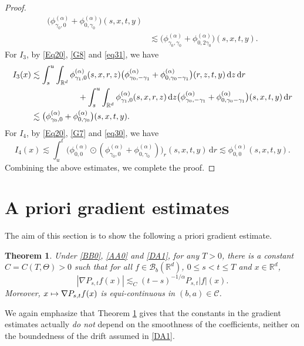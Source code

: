 \documentclass[JEP,XML,SOM,Unicode,published]{cedram}
\def\mto{\mathchoice{\longmapsto}{\mapsto}{\mapsto}{\mapsto}}
\theoremstyle{plain}
\newtheorem{theorem}{Theorem}[section]
\theoremstyle{definition}
\newcommand\cB{{\mathcal B}}
\newcommand\mR{\mathbb{R}}
\newcommand\1{{\mathbf{1}}}
\newcommand\sC{{\mathscr C}}
\newcommand{\dif}{\,\mathrm{d}}
\begin{document}
\begin{proof}
\begin{align*}
\bigl(\phi^{(\alpha)}_{\gamma_0,0}+\phi^{(\alpha)}_{0,\gamma_0}\bigr)(s,x,t,y)
\\&\lesssim\bigl(\phi^{(\alpha)}_{\gamma_0,\gamma_0}+\phi^{(\alpha)}_{0,2\gamma_0}\bigr)(s,x,t,y).
\end{align*}
For $I_3$, by {\eqref{Eq20}}, \eqref{G8} and \eqref{eq31}, we have
\begin{align*}
I_3(x)&\lesssim\int^u_s\int_{\mR^d}\phi^{(\alpha)}_{\gamma_1,0}(s,x,r,z)\bigl(\phi^{(\alpha)}_{\gamma_0,-\gamma_1}
+\phi^{(\alpha)}_{0,\gamma_0-\gamma_1}\bigr)(r,z,t,y)\dif z\dif r\\
&\hspace*{2cm}+\int^u_s\int_{\mR^d}\phi^{(\alpha)}_{\gamma_1,0}(s,x,r,z)\dif z
\bigl(\phi^{(\alpha)}_{\gamma_0,-\gamma_1}
+\phi^{(\alpha)}_{0,\gamma_0-\gamma_1}\bigr)(s,x,t,y)\dif r\\
&\lesssim \bigl(\phi^{(\alpha)}_{\gamma_0,0}+\phi^{(\alpha)}_{0,\gamma_0}\bigr)(s,x,t,y).
\end{align*}
For $I_4$, by \eqref{Eq20}, \eqref{G7} and \eqref{eq30}, we have
\begin{equation*}
I_4(x)\lesssim\int^t_u\bigl(\phi^{(\alpha)}_{0,0}\odot(\phi^{(\alpha)}_{\gamma_0,0}
+\phi^{(\alpha)}_{0,\gamma_0})\bigr)_r(s,x,t,y)\dif r\lesssim\phi^{(\alpha)}_{0,0}(s,x,t,y).
\end{equation*}
Combining the above estimates, we complete the proof.
\end{proof}

\section{A priori gradient estimates}\label{SEC_GRAD}

The aim of this section is to show the following a priori gradient estimate.
\begin{theorem}\label{Th41}
Under \eqref{BB0}, \eqref{AA0} and \eqref{DA1}, for any $T>0$, there is a constant $C=C(T,\Theta)>0$ such that
for all $f\in \cB_b(\mR^d)$,
$0\leq s<t\leq T$ and $x\in\mR^d$,
\begin{equation}\label{DQ1}
|\nabla P_{s,t}f(x)|\lesssim_C (t-s)^{-1/\alpha}P_{s,t}|f|(x).
\end{equation}
Moreover, $x\mto \nabla P_{s,t}f(x)$ is equi-continuous in $(b,a)\in\sC$.
\end{theorem}
{We again emphasize that Theorem \ref{Th41} gives that the constants in the gradient estimates actually \emph{do not} depend on the smoothness of the coefficients, neither on the boundedness of the drift assumed in \eqref{DA1}}.
\end{document}
